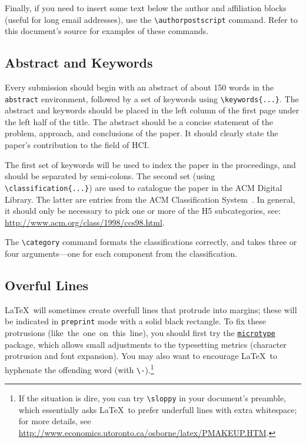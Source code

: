 \documentclass[preprint]{../latex/sigchi-modern}
\begin{document}
Finally, if you need to insert some text below the author and affiliation
blocks (useful for long email addresses), use the
\texttt{\textbackslash authorpostscript} command. Refer to this document's
source for examples of these commands.

\subsection{Abstract and Keywords}
Every submission should begin with an abstract of about 150 words in the
\texttt{abstract} environment, followed by a set of keywords using
\texttt{\textbackslash keywords\{...\}}. The abstract and keywords should be
placed in the left column of the first page under the left half of the title.
The abstract should be a concise statement of the problem, approach, and
conclusions of the paper. It should clearly state the paper's contribution to
the field of HCI.

The first set of keywords will be used to index the paper in the proceedings,
and should be separated by semi-colons. The second set (using
\texttt{\textbackslash classification\{...\}}) are used to catalogue the paper
in the ACM Digital Library. The latter are entries from the ACM Classification
System~\cite{acm_categories}. In general, it should only be necessary to pick
one or more of the H5 subcategories, see:
\url{http://www.acm.org/class/1998/ccs98.html}.

The \texttt{\textbackslash category} command formats the classifications 
correctly, and takes three or four arguments---one for each component from the
classification.

\subsection{Overful Lines}
\LaTeX\ will sometimes create overfull lines that protrude into margins; these
will be indicated in \texttt{preprint} mode with a solid black rectangle. To fix
these protrusions (like~the~one~on~this~line), you should first try the
\href{http://ctan.org/pkg/microtype}{\texttt{microtype}} package, which allows
small adjustments to the typesetting metrics (character protrusion and font
expansion). You may also want to encourage \LaTeX\ to hyphenate the offending
word (with \texttt{\textbackslash -}).\footnote{If the situation is dire, you 
can try \texttt{\textbackslash sloppy} in your document's preamble, which
essentially asks \LaTeX\ to prefer underfull lines with extra whitespace; for
more details, see
\url{http://www.economics.utoronto.ca/osborne/latex/PMAKEUP.HTM}.}
\end{document}
